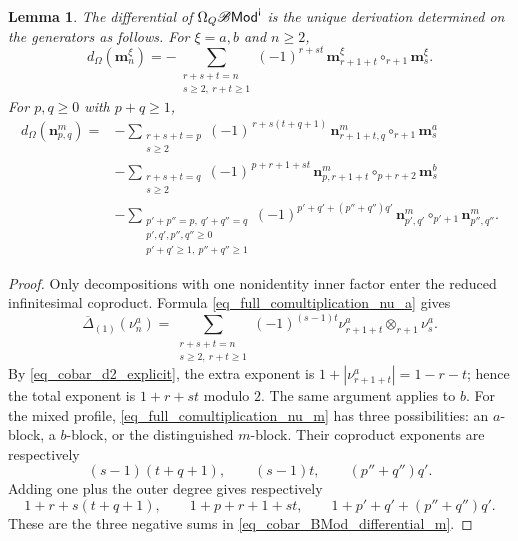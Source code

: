 \documentclass[11pt,letterpaper]{article}
\numberwithin{equation}{section}
\theoremstyle{plain}
\newtheorem{lem}[thm]{Lemma}
\theoremstyle{definition}
\theoremstyle{remark}
\newcommand{\antishriek}{%
	\mathord{\mathchoice
		{\rotatebox[origin=c]{180}{$\displaystyle !$}}
		{\rotatebox[origin=c]{180}{$\textstyle !$}}
		{\rotatebox[origin=c]{180}{$\scriptstyle !$}}
		{\rotatebox[origin=c]{180}{$\scriptscriptstyle !$}}}}
\begin{document}
	\begin{lem}
		\label{lem_cobar_BMod_differential}
		The differential of
		$\Omega_Q\mathscr B\mathsf{Mod}^{\antishriek}$
		is the unique derivation determined on the generators as follows.
		For $\xi=a,b$ and $n\geq2$,
		\begin{equation*}
			d_\Omega(\mathbf m_n^\xi)
			=-
			\sum_{\substack{
					r+s+t=n\\
					s\geq2,\ r+t\geq1
			}}
			(-1)^{r+st}
			\,
			\mathbf m_{r+1+t}^\xi
			\circ_{r+1}
			\mathbf m_s^\xi .
		\end{equation*}
		For $p,q\geq0$ with $p+q\geq1$,
		\begin{align}
			\label{eq_cobar_BMod_differential_m}
			d_\Omega(\mathbf n_{p,q}^m)
			={}&-
			\sum_{\substack{
					r+s+t=p\\
					s\geq2
			}}
			(-1)^{\,r+s(t+q+1)}
			\,
			\mathbf n_{r+1+t,q}^m
			\circ_{r+1}
			\mathbf m_s^a
			\nonumber\\
			&-
			\sum_{\substack{
					r+s+t=q\\
					s\geq2
			}}
			(-1)^{\,p+r+1+st}
			\,
			\mathbf n_{p,r+1+t}^m
			\circ_{p+r+2}
			\mathbf m_s^b
			\nonumber\\
			&-
			\sum_{\substack{
					p'+p''=p,\ q'+q''=q\\
					p',q',p'',q''\geq0\\
					p'+q'\geq1,\ p''+q''\geq1
			}}
			(-1)^{
				p'+q'+(p''+q'')q'
			}
			\,
			\mathbf n_{p',q'}^m
			\circ_{p'+1}
			\mathbf n_{p'',q''}^m .
		\end{align}
	\end{lem}

	\begin{proof}
Only decompositions with one nonidentity inner factor enter the reduced
infinitesimal coproduct. Formula \eqref{eq_full_comultiplication_nu_a} gives
\begin{equation}
\label{eq:reduced_inf_comult_nu_a}
\overline\Delta_{(1)}(\nu_n^a)
=\sum_{\substack{r+s+t=n\\s\ge2,\ r+t\ge1}}
(-1)^{(s-1)t}\nu_{r+1+t}^a\otimes_{r+1}\nu_s^a.
\end{equation}
By \eqref{eq_cobar_d2_explicit}, the extra exponent is
$1+|\nu_{r+1+t}^a|=1-r-t$; hence the total exponent is
$1+r+st$ modulo $2$. The same argument applies to $b$.
For the mixed profile, \eqref{eq_full_comultiplication_nu_m} has three
possibilities: an $a$-block, a $b$-block, or the distinguished $m$-block.
Their coproduct exponents are respectively
\[
(s-1)(t+q+1),\qquad (s-1)t,\qquad (p''+q'')q'.
\]
Adding one plus the outer degree gives respectively
\[
1+r+s(t+q+1),\qquad 1+p+r+1+st,\qquad
1+p'+q'+(p''+q'')q'.
\]
These are the three negative sums in
\eqref{eq_cobar_BMod_differential_m}.
\end{proof}
\end{document}

